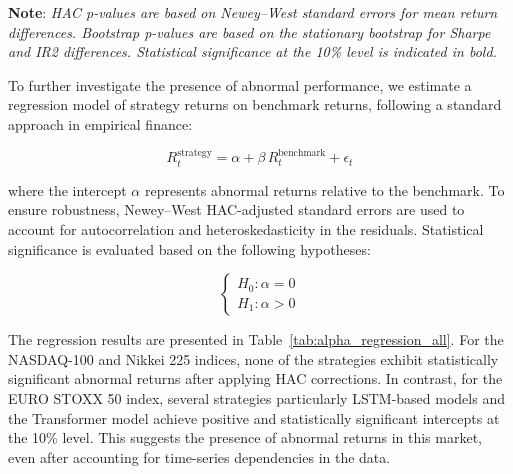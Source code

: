 \documentclass[]{elsarticle}
\begin{document}
\vspace{-0.4cm}
\linespread{0.65}\selectfont
{\noindent\scriptsize \textbf{Note}: \textit{HAC p-values are based on Newey--West standard errors for mean return differences. Bootstrap p-values are based on the stationary bootstrap for Sharpe and IR2 differences. Statistical significance at the 10\% level is indicated in bold.}}

\linespread{1.5}\selectfont

To further investigate the presence of abnormal performance, we estimate a regression model of strategy returns on benchmark returns, following a standard approach in empirical finance:

\begin{equation}
R^{\text{strategy}}_t = \alpha + \beta \, R^{\text{benchmark}}_t + \epsilon_t
\end{equation}

\noindent where the intercept $\alpha$ represents abnormal returns relative to the benchmark. To ensure robustness, Newey--West HAC-adjusted standard errors are used to account for autocorrelation and heteroskedasticity in the residuals. Statistical significance is evaluated based on the following hypotheses:

\begin{equation}
\begin{cases}
H_0: \alpha = 0 \\
H_1: \alpha > 0
\end{cases}
\end{equation}

The regression results are presented in Table~\ref{tab:alpha_regression_all}. For the NASDAQ-100 and Nikkei 225 indices, none of the strategies exhibit statistically significant abnormal returns after applying HAC corrections. In contrast, for the EURO STOXX 50 index, several strategies particularly LSTM-based models and the Transformer model achieve positive and statistically significant intercepts at the 10\% level. This suggests the presence of abnormal returns in this market, even after accounting for time-series dependencies in the data.
\end{document}
